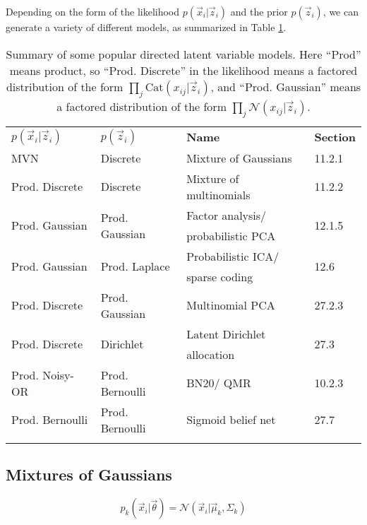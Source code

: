 Depending on the form of the likelihood $p(\vec{x}_i|\vec{z}_i)$ and the prior $p(\vec{z}_i)$, we can generate a variety of different models, as summarized in Table \ref{tab:popular-directed-latent-variable-models}.

\begin{table}
\centering
\begin{tabular}{llll}
\hline\noalign{\smallskip}
$p(\vec{x}_i|\vec{z}_i)$ & $p(\vec{z}_i)$ & \textbf{Name} & \textbf{Section} \\
\noalign{\smallskip}\svhline\noalign{\smallskip}
MVN & Discrete & Mixture of Gaussians & 11.2.1 \\
Prod. Discrete & Discrete & Mixture of multinomials & 11.2.2 \\
\multirow{2}{*}{Prod. Gaussian} & \multirow{2}{*}{Prod. Gaussian} & Factor analysis/ & \multirow{2}{*}{12.1.5} \\
                                &                                 & probabilistic PCA&  \\
\multirow{2}{*}{Prod. Gaussian} & \multirow{2}{*}{Prod. Laplace} & Probabilistic ICA/& \multirow{2}{*}{12.6} \\
                                &                                & sparse coding     &  \\
Prod. Discrete & Prod. Gaussian & Multinomial PCA & 27.2.3 \\
\multirow{2}{*}{Prod. Discrete} & \multirow{2}{*}{Dirichlet} & Latent Dirichlet & \multirow{2}{*}{27.3}\\
                                &                            & allocation       &  \\
Prod. Noisy-OR & Prod. Bernoulli & BN20/ QMR & 10.2.3 \\
Prod. Bernoulli & Prod. Bernoulli & Sigmoid belief net & 27.7 \\
\noalign{\smallskip}\hline
\end{tabular}
\caption{Summary of some popular directed latent variable models. Here “Prod” means product, so “Prod. Discrete” in the likelihood means a factored distribution of the form $\prod_j \mathrm{Cat}(x_{ij}|\vec{z}_i)$, and “Prod. Gaussian” means a factored distribution of the form $\prod_j \mathcal{N}(x_{ij}|\vec{z}_i)$.}
\label{tab:popular-directed-latent-variable-models}
\end{table}


\subsection{Mixtures of Gaussians}
\begin{equation}
p_k(\vec{x}_i|\vec{\theta})=\mathcal{N}(\vec{x}_i|\vec{\mu}_k,\Sigma_k)
\end{equation}


